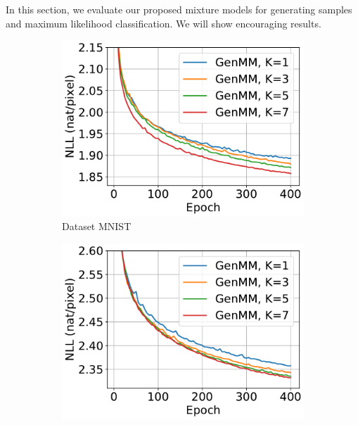 In this section, we evaluate our proposed mixture models for generating samples and maximum likelihood classification. We will show encouraging results.


\begin{figure}[!ht]
  \captionsetup[subfigure]{justification=centering}
  \centering
  \begin{subfigure}{.4\textwidth}
    \centering
    \includegraphics[width=1\linewidth]{images/supply/mnist_GenMM_nll_curves-crop.pdf}
    \vspace{-0.6cm}
    \caption{Dataset MNIST}
    \label{fig-genmm-mnist-nll-curve}
  \end{subfigure}\hspace{1cm}
  \begin{subfigure}{.4\textwidth}
    \centering
    \includegraphics[width=1\linewidth]{images/supply/fashion_GenMM_nll_curves-crop.pdf}

\end{subfigure}
\end{figure}
